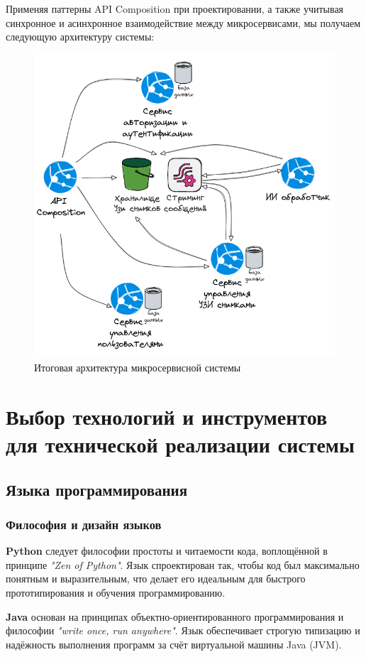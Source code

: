 Применяя паттерны API Composition при проектировании, а также учитывая синхронное и асинхронное взаимодействие между микросервисами,
мы получаем следующую архитектуру системы:
\begin{figure}[H]%
	\begin{center}
		\includegraphics[width=.6\columnwidth]{./img/new/microservice_arch.png}%
	\end{center}
	\caption{Итоговая архитектура микросервисной системы}%
	\label{pic:microservice_arch}%
\end{figure}

\section{Выбор технологий и инструментов для технической реализации системы}

\subsection{Языка программирования}

\subsubsection*{Философия и дизайн языков}

\textbf{Python} следует философии простоты и читаемости кода, воплощённой в принципе \textit{"Zen of Python"}. Язык спроектирован так, чтобы код был максимально понятным и выразительным, что делает его идеальным для быстрого прототипирования и обучения программированию.

\textbf{Java} основан на принципах объектно-ориентированного программирования и философии \textit{"write once, run anywhere"}. Язык обеспечивает строгую типизацию и надёжность выполнения программ за счёт виртуальной машины Java (JVM).

